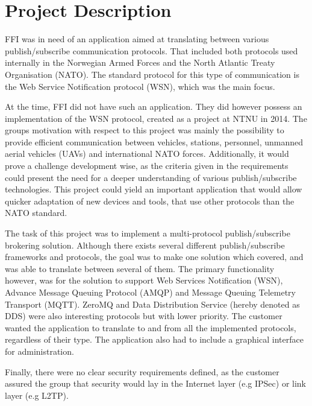 \section{Project Description}
\label{sec:introduction-project_description}

FFI was in need of an application aimed at translating between various publish/subscribe communication protocols. That included both protocols used internally in the Norwegian Armed Forces and the North Atlantic Treaty Organisation (NATO). The standard protocol for this type of communication is the Web Service Notification protocol (WSN), which was the main focus.

At the time, FFI did not have such an application. They did however possess an implementation of the WSN protocol, created as a project at NTNU in 2014. The groups motivation with respect to this project was mainly the possibility to provide efficient communication between vehicles, stations, personnel, unmanned aerial vehicles (UAVs) and international NATO forces. Additionally, it would prove a challenge development wise, as the criteria given in the requirements could present the need for a  deeper understanding of various publish/subscribe technologies. This project could yield an important application that would allow quicker adaptation of new devices and tools, that use other protocols than the NATO standard.

The task of this project was to implement a multi-protocol publish/subscribe brokering solution. Although there exists several different publish/subscribe frameworks and protocols, the goal was to make one solution which covered, and was able to translate between several of them. The primary functionality however, was for the solution to support Web Services Notification (WSN), Advance Message Queuing Protocol (AMQP) and Message Queuing Telemetry Transport (MQTT). ZeroMQ and Data Distribution Service (hereby denoted as DDS) were also interesting protocols but with lower priority. The customer wanted the application to translate to and from all the implemented protocols, regardless of their type. The application also had to include a graphical interface for administration.

Finally, there were no clear security requirements defined, as the customer assured the group that security would lay in the Internet layer (e.g IPSec) or link layer (e.g L2TP).


\clearpage